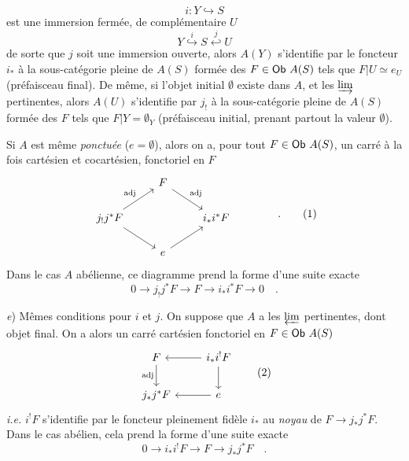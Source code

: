 \[
i : Y \hookrightarrow S
\]
est une immersion fermée, de complémentaire $U$
\[
Y \overset{i}{\hookrightarrow} S \overset{j}{\hookleftarrow} U
\]
de sorte que $j$ soit une immersion ouverte, alors $A(Y)$ s'identifie par le foncteur $i_{*}$ à la sous-catégorie pleine de $A(S)$ formée des $F \in \mathsf{Ob}\ A(S)$ tels que $F|U \simeq e_{U}$ (préfaisceau final). De même, si l'objet initial $\emptyset$ existe dans $A$, et les $\varinjlim$ pertinentes, alors $A(U)$ s'identifie par $j_{!}$ à la sous-catégorie pleine de $A(S)$ formée des $F$ tels que $F|Y=\emptyset_{Y}$ (préfaisceau initial, prenant partout la valeur $\emptyset$).

Si $A$ est même \textit{ponctuée} ($e=\emptyset$), alors on a, pour tout $F\in \mathsf{Ob}\ A(S)$, un carré à la fois cartésien et cocartésien, fonctoriel en $F$
\[
\begin{tikzcd}
 & F \arrow[dr, "\text{adj}"] & \\
j_{!}j^{*}F \arrow[ur, "\text{adj}"] \arrow[dr] & & i_{*}i^{*}F \\
 & e \arrow[ur] &
\end{tikzcd}
\qquad\qquad \text{.}
\tag*{(1)}
\]
Dans le cas $A$ abélienne, ce diagramme prend la forme d'une suite exacte
\[
0 \longrightarrow j_{!}j^{*}F \longrightarrow F \longrightarrow i_{*}i^{*}F \longrightarrow 0 \quad .
\]

\textit{e}) Mêmes conditions pour $i$ et $j$. On suppose que $A$ a les $\varprojlim$ pertinentes, dont objet final. On a alors un carré cartésien fonctoriel en $F\in \mathsf{Ob}\ A(S)$
\[
\begin{tikzcd}
F \arrow[d, "\text{adj}"'] & i_{*}i^{!}F \arrow[l] \arrow[d] \\
j_{*}j^{*}F & e \arrow[l]
\end{tikzcd}
\tag*{(2)}
\]
\textit{i.e.} $i^{!}F$ s'identifie par le foncteur pleinement fidèle $i_{*}$ au \textit{noyau} de $F\to j_{*}j^{*}F$. Dans le cas abélien, cela prend la forme d'une suite exacte
\[
0 \longrightarrow i_{*}i^{!}F \longrightarrow F \longrightarrow j_{*}j^{*}F \quad .
\]

